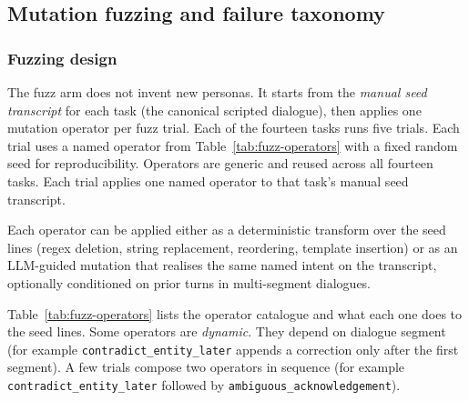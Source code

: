 \subsection{Mutation fuzzing and failure taxonomy}

\subsubsection{Fuzzing design}

The fuzz arm does not invent new personas. It starts from the \emph{manual seed transcript} for each task (the canonical scripted dialogue), then applies one mutation operator per fuzz trial. Each of the fourteen tasks runs five trials. Each trial uses a named operator from Table~\ref{tab:fuzz-operators} with a fixed random seed for reproducibility. Operators are generic and reused across all fourteen tasks. Each trial applies one named operator to that task's manual seed transcript.

Each operator can be applied either as a deterministic transform over the seed lines (regex deletion, string replacement, reordering, template insertion) or as an LLM-guided mutation that realises the same named intent on the transcript, optionally conditioned on prior turns in multi-segment dialogues.

Table~\ref{tab:fuzz-operators} lists the operator catalogue and what each one does to the seed lines. Some operators are \emph{dynamic}. They depend on dialogue segment (for example \texttt{contradict\_entity\_later} appends a correction only after the first segment). A few trials compose two operators in sequence (for example \texttt{contradict\_entity\_later} followed by \texttt{ambiguous\_acknowledgement}).

